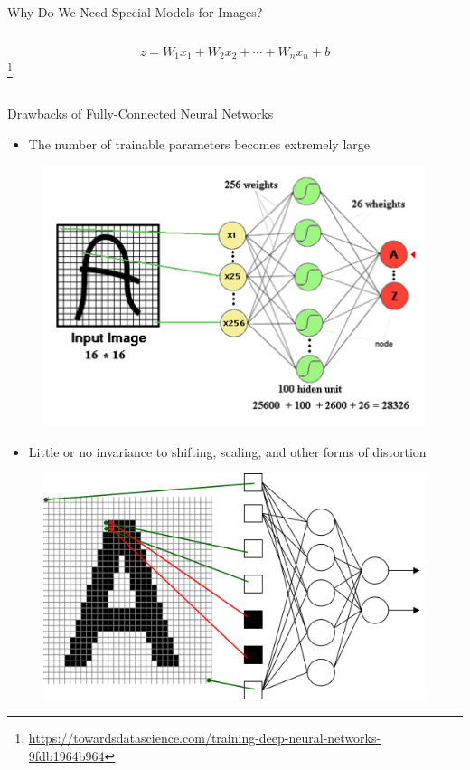 \begin{frame}[allowframebreaks]{Why Do We Need Special Models for Images?}
\begin{columns}
\begin{column}{0.75\textwidth}
            $$z = W_1x_1 + W_2x_2 + \cdots + W_n x_n + b$$
            \footnote{\url{https://towardsdatascience.com/training-deep-neural-networks-9fdb1964b964}}
        \end{column}
    \end{columns}
\end{frame}

\begin{frame}[allowframebreaks]{Drawbacks of Fully-Connected Neural Networks}
    \begin{itemize}
        \item The number of trainable parameters becomes extremely large
    \end{itemize}

    \begin{figure}
    \centering
    \includegraphics[width=1.0\textwidth,height=0.8\textheight,keepaspectratio]{images/cnn/nn_2.png}
    \end{figure}

\framebreak

    \begin{itemize}
        \item Little or no invariance to shifting, scaling, and other forms of distortion
    \end{itemize}

    \begin{figure}
    \centering
    \includegraphics[width=1.0\textwidth,height=0.7\textheight,keepaspectratio]{images/cnn/nn_3.png}
    \end{figure}


\end{frame}
